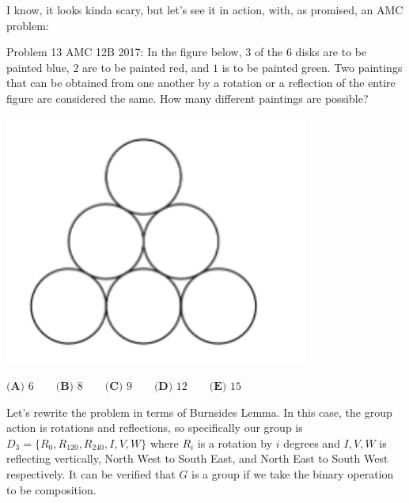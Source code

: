 \documentclass{article}
\begin{document}
I know, it looks kinda scary, but let's see it in action, with, as promised, an AMC problem:

Problem 13 AMC 12B 2017:
In the figure below, $3$ of the $6$ disks are to be painted blue, $2$ are to be painted red, and $1$ is to be painted green. Two paintings that can be obtained from one another by a rotation or a reflection of the entire figure are considered the same. How many different paintings are possible?
\begin{center}
    \includegraphics[width=10cm, scale=1.5]{nov23/images/amc12b1017p13.png}
\end{center}

$\textbf{(A) } 6 \qquad \textbf{(B) } 8 \qquad \textbf{(C) } 9 \qquad \textbf{(D) } 12 \qquad \textbf{(E) } 15$

Let's rewrite the problem in terms of Burnsides Lemma. In this case, the group action is rotations and reflections, so specifically our group is $D_3=\{R_0,R_{120},R_{240}, I,V,W\}$ where $R_i$ is a rotation by $i$ degrees and $I, V, W$ is reflecting vertically, North West to South East, and North East to South West respectively. It can be verified that $G$ is a group if we take the binary operation to be composition.
\end{document}
